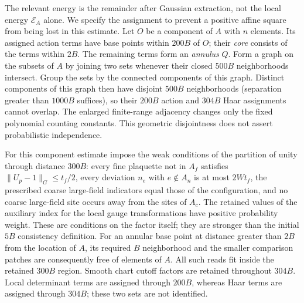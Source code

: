 The relevant energy is the remainder after Gaussian extraction,
not the local energy $\mathcal E_A$ alone. We specify the assignment to prevent a
positive affine square from being lost in this estimate.
Let $O$ be a component of $A$ with $n$ elements. Its assigned action
terms have base points within $200B$ of $O$; their \emph{core} consists of the
terms within $2B$. The remaining terms form an \emph{annulus} $Q$.
Form a graph on the subsets of $A$ by joining two sets whenever their
closed $500B$ neighborhoods intersect. Group the sets by the connected
components of this graph. Distinct components of this graph then have
disjoint $500B$ neighborhoods (separation greater than $1000B$ suffices),
so their $200B$ action and $304B$ Haar assignments cannot overlap.
The enlarged finite-range adjacency changes only the fixed polynomial
counting constants. This geometric disjointness does not assert
probabilistic independence.

For this component estimate impose the weak conditions of the partition of unity
through distance $300B$: every fine plaquette not in $A_f$ satisfies
$\|U_p-1\|_G\le t_f/2$, every deviation $n_e$ with $e\notin A_n$ is at most $2Wt_f$,
the prescribed coarse large-field indicators equal those of the configuration, and no coarse
large-field site occurs away from the sites of $A_c$. The retained values of the auxiliary index for the local gauge transformations
have positive probability weight. These are conditions on the factor itself;
they are stronger than the initial $5B$ consistency definition.
For an annular base point at distance greater than $2B$ from the location of $A$,
its required $B$ neighborhood and the smaller comparison patches
are consequently free of elements of $A$. All such reads fit inside
the retained $300B$ region. Smooth chart cutoff factors are retained
throughout $304B$.
Local determinant terms are assigned through $200B$, whereas Haar
terms are assigned through $304B$; these two sets are not identified.

